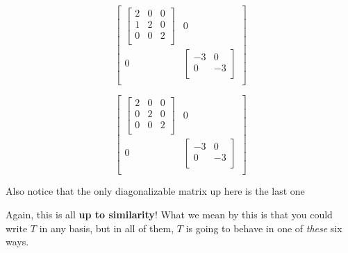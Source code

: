 \documentclass[12pt]{article}
\begin{document}
{\begin{multicols}{3}
      \[
        \begin{bmatrix}
          \begin{bmatrix}
            2 & 0 & 0\\
            1 & 2 & 0 \\
            0 & 0 & 2 \\
          \end{bmatrix} & 0 \\
          0 & \begin{bmatrix}
            -3 & 0 \\
            0 & -3 \\
          \end{bmatrix} \\
        \end{bmatrix}
      \]

      \[
        \begin{bmatrix}
          \begin{bmatrix}
            2 & 0 & 0\\
            0 & 2 & 0 \\
            0 & 0 & 2 \\
          \end{bmatrix} & 0 \\
          0 & \begin{bmatrix}
            -3 & 0 \\
            0 & -3 \\
          \end{bmatrix} \\
        \end{bmatrix}
      \]
    \end{multicols}

    Also notice that the only diagonalizable matrix up here is the last one

    Again, this is all {\bf up to similarity}! What we mean by this is that you
    could write $T$ in any basis, but in all of them, $T$ is going to behave in
    one of {\it these} six ways.
  }
\end{document}
